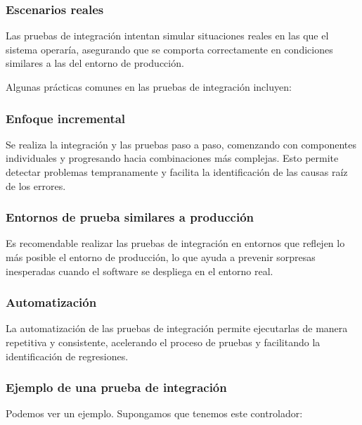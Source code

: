 \documentclass[executivepaper]{article}
\begin{document}
\subsubsection*{Escenarios reales}
Las pruebas de integración intentan simular situaciones reales en las que el sistema operaría, asegurando que se comporta correctamente en condiciones similares a las del entorno de producción.

Algunas prácticas comunes en las pruebas de integración incluyen:

\subsubsection*{Enfoque incremental}
Se realiza la integración y las pruebas paso a paso, comenzando con componentes individuales y progresando hacia combinaciones más complejas. Esto permite detectar problemas tempranamente y facilita la identificación de las causas raíz de los errores.

\subsubsection*{Entornos de prueba similares a producción}
Es recomendable realizar las pruebas de integración en entornos que reflejen lo más posible el entorno de producción, lo que ayuda a prevenir sorpresas inesperadas cuando el software se despliega en el entorno real.

\subsubsection*{Automatización}
La automatización de las pruebas de integración permite ejecutarlas de manera repetitiva y consistente, acelerando el proceso de pruebas y facilitando la identificación de regresiones.

\subsubsection*{Ejemplo de una prueba de integración}

Podemos ver un ejemplo. Supongamos que tenemos este controlador:
\end{document}
